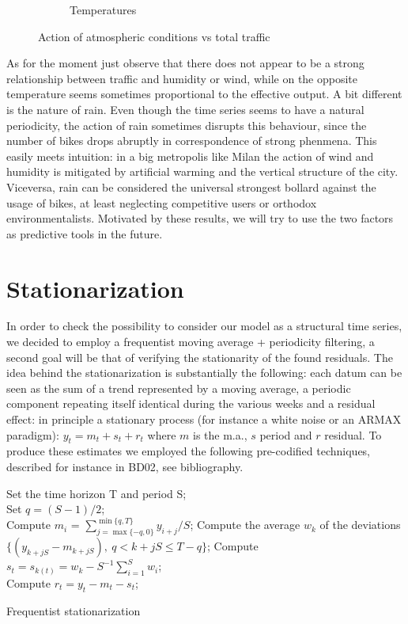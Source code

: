 \documentclass[11pt,twoside]{report}
\begin{document}
\begin{figure}[H]
\begin{subfigure}[H]{1\linewidth}
		\caption{Temperatures}
		\label{fig:temperature}
	\end{subfigure}
	\caption{Action of atmospheric conditions vs total traffic}
\end{figure}
\newpage

As for the moment just observe that there does not appear to be a strong relationship between traffic and humidity or wind, while on the opposite temperature seems sometimes proportional to the effective output. A bit different is the nature of rain. Even though the time series seems to have a natural periodicity, the action of rain sometimes disrupts this behaviour, since the number of bikes drops abruptly in correspondence of strong phenmena.  This easily meets intuition: in a big metropolis like Milan the action of wind and humidity is mitigated by artificial warming and the vertical structure of the city. Viceversa, rain can be considered the universal strongest bollard against the usage of bikes, at least neglecting competitive users or orthodox environmentalists. Motivated by these results, we will try to use the two factors as predictive tools in the future.

\section{Stationarization}
In order to check the possibility to consider our model as a structural time series, we decided to employ a frequentist moving average + periodicity filtering, a second goal will be that of verifying the stationarity of the found residuals. The idea behind the stationarization is substantially the following: each datum can be seen as the sum of a trend represented by a moving average, a periodic component repeating itself identical during the various weeks and a residual effect: in principle a stationary process (for instance a white noise or an ARMAX paradigm): $ y_t = m_t + s_t +r_t $ where $ m $ is the m.a., $ s $ period and $ r $ residual. To produce these estimates we employed the following pre-codified techniques, described for instance in BD02, see bibliography.\\

\begin{algorithm}[H]
	\SetAlgoLined
	Set the time horizon T and period S;\\
	Set $ q=(S-1)/2 $;\\
	{
		Compute $ m_i $ = $\sum_{j=\max\{-q,0\}}^{\min\{q,T\}} y_{i+j}/S$;
	}
	{
		Compute the average $ w_k $ of the deviations $ \{(y_{k+jS} - m_{k+jS} ),\ q < k+jS \leq T-q\} $;
	}
	{
		Compute  $ s_t = s_{k(t)} = w_k-S^{-1}\sum_{i=1}^{S}w_i $;\\
		Compute  $ r_t=y_t-m_t-s_t $;
	}

	\caption{Frequentist stationarization}
	
\end{algorithm}
\end{document}
